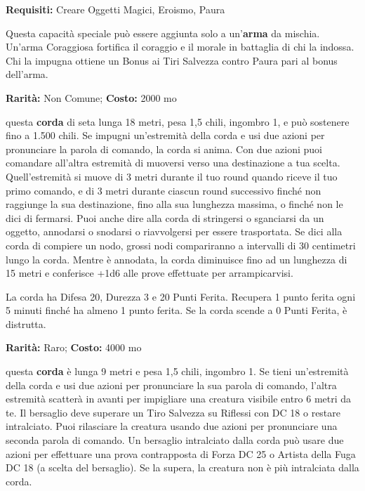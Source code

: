 \begin{multicols}{2}
\textbf{Requisiti:} Creare Oggetti Magici, Eroismo, Paura

Questa capacità speciale può essere aggiunta solo a un'\textbf{arma} da mischia. Un'arma Coraggiosa fortifica il coraggio e il morale in battaglia di chi la indossa. Chi la impugna ottiene un Bonus ai Tiri Salvezza contro Paura pari al bonus dell'arma.


\textbf{Rarità:} Non Comune; \textbf{Costo:} 2000 mo

questa \textbf{corda} di seta lunga 18 metri, pesa 1,5 chili, ingombro 1, e può sostenere fino a 1.500 chili. Se impugni un'estremità della corda e usi due azioni per pronunciare la parola di comando, la corda si anima. Con due azioni puoi comandare all'altra estremità di muoversi verso una destinazione a tua scelta. Quell'estremità si muove di 3 metri durante il tuo round quando riceve il tuo primo comando, e di 3 metri durante ciascun round successivo finché non raggiunge la sua destinazione, fino alla sua lunghezza massima, o finché non le dici di fermarsi. Puoi anche dire alla corda di stringersi o sganciarsi da un oggetto, annodarsi o snodarsi o riavvolgersi per essere trasportata. Se dici alla corda di compiere un nodo, grossi nodi compariranno a intervalli di 30 centimetri lungo la corda. Mentre è annodata, la corda diminuisce fino ad un lunghezza di 15 metri e conferisce +1d6 alle prove effettuate per arrampicarvisi.

La corda ha Difesa 20, Durezza 3 e 20 Punti Ferita. Recupera 1 punto ferita ogni 5 minuti finché ha almeno 1 punto ferita. Se la corda scende a 0 Punti Ferita, è distrutta.


\textbf{Rarità:} Raro; \textbf{Costo:} 4000 mo

questa \textbf{corda} è lunga 9 metri e pesa 1,5 chili, ingombro 1. Se tieni un'estremità della corda e usi due azioni per pronunciare la sua parola di comando, l'altra estremità scatterà in avanti per impigliare una creatura visibile entro 6 metri da te. Il bersaglio deve superare un Tiro Salvezza su Riflessi con DC 18 o restare intralciato. Puoi rilasciare la creatura usando due azioni per pronunciare una seconda parola di comando. Un bersaglio intralciato dalla corda può usare due azioni per effettuare una prova contrapposta di Forza DC 25 o Artista della Fuga DC 18 (a scelta del bersaglio). Se la supera, la creatura non è più intralciata dalla corda.


\end{multicols}
